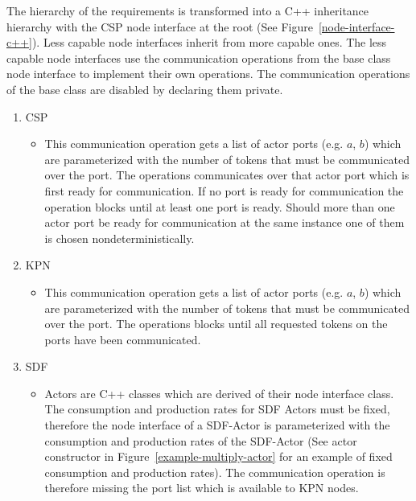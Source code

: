 The hierarchy of the requirements is transformed into a C++ inheritance
hierarchy with the CSP node interface at the root (See Figure~\ref{node-interface-c++}).
Less capable node interfaces inherit from more capable ones. The
less capable node interfaces use the communication operations from the base class node
interface to implement their own operations. The communication operations of the
base class are disabled by declaring them private.

\begin{enumerate}
\item CSP
  \begin{itemize}
  \item  {}

    This communication operation gets a list of actor ports (e.g. $a$, $b$) which
    are parameterized with the number of tokens that must be communicated
    over the port. The operations communicates over that actor port which is first ready
    for communication. If no port is ready for communication the operation blocks until
    at least one port is ready. Should more than one actor port be ready for
    communication at the same instance one of them is chosen nondeterministically.
  \end  {itemize}
\item KPN
  \begin{itemize}
  \item {}

    This communication operation gets a list of actor ports (e.g. $a$, $b$) which
    are parameterized with the number of tokens that must be communicated
    over the port. The operations blocks until all requested tokens on the ports
    have been communicated.
  \end  {itemize}
\item SDF
  \begin{itemize}
  \item {}

    Actors are C++ classes which are derived of their node interface class.
    The consumption and production rates for SDF Actors must be fixed, therefore
    the node interface of a SDF-Actor is parameterized with the consumption and production
    rates of the SDF-Actor (See actor constructor in Figure~\ref{example-multiply-actor} for an
    example of fixed consumption and production rates). The communication operation  is
    therefore missing the port list which is available to KPN nodes.
  \end  {itemize}
\end{enumerate}

